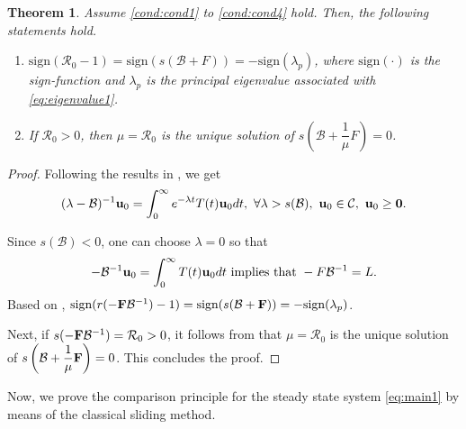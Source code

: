 \documentclass[a4paper,11pt]{amsart}
\newtheorem{theorem}{Theorem}
\theoremstyle{definition}
\numberwithin{equation}{section}
\theoremstyle{definition}
\begin{document}
\begin{theorem}\label{basic}
Assume  \ref{cond:cond1} to \ref{cond:cond4} hold. Then, the following statements hold.
\begin{enumerate}[label=(\roman*)]
\item \label{casei1} $\text{sign}(\mathcal{R}_0-1)=\text{sign}(s(\mathcal{B}+F))=-\text{sign}(\lambda_p)$,
where $\text{sign}(\cdot)$ is the sign-function and $\lambda_p$ is the principal eigenvalue associated with \eqref{eq:eigenvalue1}.


\item \label{caseii1} If $\mathcal{R}_0>0$, then $\mu = \mathcal{R}_0$ is the unique solution of $s\left(\mathcal{B}+\dfrac{1}{\mu}F\right)=0$.
\end{enumerate}


\end{theorem}



\begin{proof}

Following the results in \cite[Theorem 3.12]{thieme_spectral_2009}, we get
\begin{align*}
(\lambda-\mathcal{B})^{-1}{\bf u}_0=\int_0^\infty e^{-\lambda t} T(t){\bf u}_0dt,~\forall \lambda>s(\mathcal{B}),~{\bf u}_0\in \mathcal{C},~{\bf u}_0\geq \textbf{0}.
\end{align*}

Since $s(\mathcal{B})<0$, one can choose $\lambda =0$ so that
\begin{align*}
-\mathcal{B}^{-1}{\bf u}_0=\int_0^\infty  T(t){\bf u}_0dt \text{ implies that }-F\mathcal{B}^{-1}=L.
\end{align*}
Based on \cite[Theorem 3.5]{thieme_spectral_2009}, $\text{sign}(r(-{\bf F}\mathcal{B}^{-1})-1)=\text{sign}(s(\mathcal{B}+{\bf F}))=-\text{sign}(\lambda_p)$.

Next, if $s(-{\bf F}\mathcal{B}^{-1})=\mathcal{R}_0>0$, it follows from \cite[Theorem 5.2]{feng_principal_2024} that $\mu=\mathcal{R}_0$ is the unique solution of $s\left(\mathcal{B}+\dfrac{1}{\mu}{\bf F}\right)=0$. This concludes the proof.


\end{proof}


Now, we prove the comparison principle for the steady state system \eqref{eq:main1} by means of the classical sliding method.  
\end{document}
